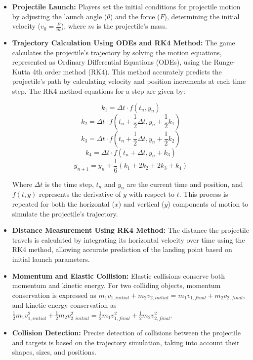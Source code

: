 \documentclass[12pt]{article}
\begin{document}
\begin{itemize}
    \item \textbf{Projectile Launch:} Players set the initial conditions for projectile motion by adjusting the launch angle (\(\theta\)) and the force (\(F\)), determining the initial velocity (\(v_0 = \frac{F}{m}\)), where \(m\) is the projectile's mass.
    
    \item \textbf{Trajectory Calculation Using ODEs and RK4 Method:} The game calculates the projectile's trajectory by solving the motion equations, represented as Ordinary Differential Equations (ODEs), using the Runge-Kutta 4th order method (RK4). This method accurately predicts the projectile's path by calculating velocity and position increments at each time step. The RK4 method equations for a step are given by:
    
        \[
        k_1 = \Delta t \cdot f(t_n, y_n)
        \]
        \[
        k_2 = \Delta t \cdot f(t_n + \frac{1}{2}\Delta t, y_n + \frac{1}{2}k_1)
        \]
        \[
        k_3 = \Delta t \cdot f(t_n + \frac{1}{2}\Delta t, y_n + \frac{1}{2}k_2)
        \]
        \[
        k_4 = \Delta t \cdot f(t_n + \Delta t, y_n + k_3)
        \]
        \[
        y_{n+1} = y_n + \frac{1}{6}(k_1 + 2k_2 + 2k_3 + k_4)
        \]
        
        Where \(\Delta t\) is the time step, \(t_n\) and \(y_n\) are the current time and position, and \(f(t, y)\) represents the derivative of \(y\) with respect to \(t\). This process is repeated for both the horizontal (\(x\)) and vertical (\(y\)) components of motion to simulate the projectile's trajectory.
    
    \item \textbf{Distance Measurement Using RK4 Method:} The distance the projectile travels is calculated by integrating its horizontal velocity over time using the RK4 method, allowing accurate prediction of the landing point based on initial launch parameters.

    \item \textbf{Momentum and Elastic Collision:} Elastic collisions conserve both momentum and kinetic energy. For two colliding objects, momentum conservation is expressed as \(m_1v_{1,initial} + m_2v_{2,initial} = m_1v_{1,final} + m_2v_{2,final}\), and kinetic energy conservation as \(\frac{1}{2}m_1v_{1,initial}^2 + \frac{1}{2}m_2v_{2,initial}^2 = \frac{1}{2}m_1v_{1,final}^2 + \frac{1}{2}m_2v_{2,final}^2\).
    
    \item \textbf{Collision Detection:} Precise detection of collisions between the projectile and targets is based on the trajectory simulation, taking into account their shapes, sizes, and positions.
\end{itemize}
\end{document}
